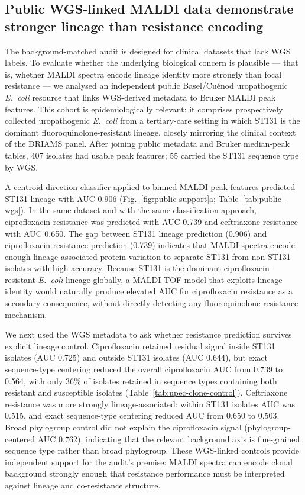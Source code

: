 \documentclass[11pt]{article}
\begin{document}


\subsection*{Public WGS-linked MALDI data demonstrate stronger lineage than resistance encoding}

The background-matched audit is designed for clinical datasets that lack WGS labels. To evaluate whether the underlying biological concern is plausible --- that is, whether MALDI spectra encode lineage identity more strongly than focal resistance --- we analysed an independent public Basel/Cu\'{e}nod uropathogenic \textit{E.~coli} resource that links WGS-derived metadata to Bruker MALDI peak features\cite{cuenod2023papgii}. This cohort is epidemiologically relevant: it comprises prospectively collected uropathogenic \textit{E.~coli} from a tertiary-care setting in which ST131 is the dominant fluoroquinolone-resistant lineage, closely mirroring the clinical context of the DRIAMS panel. After joining public metadata and Bruker median-peak tables, 407 isolates had usable peak features; 55 carried the ST131 sequence type by WGS.

A centroid-direction classifier applied to binned MALDI peak features predicted ST131 lineage with AUC 0.906 (Fig.~\ref{fig:public-support}a; Table~\ref{tab:public-wgs}). In the same dataset and with the same classification approach, ciprofloxacin resistance was predicted with AUC 0.739 and ceftriaxone resistance with AUC 0.650. The gap between ST131 lineage prediction (0.906) and ciprofloxacin resistance prediction (0.739) indicates that MALDI spectra encode enough lineage-associated protein variation to separate ST131 from non-ST131 isolates with high accuracy. Because ST131 is the dominant ciprofloxacin-resistant \textit{E.~coli} lineage globally, a MALDI-TOF model that exploits lineage identity would naturally produce elevated AUC for ciprofloxacin resistance as a secondary consequence, without directly detecting any fluoroquinolone resistance mechanism.

We next used the WGS metadata to ask whether resistance prediction survives explicit lineage control. Ciprofloxacin retained residual signal inside ST131 isolates (AUC 0.725) and outside ST131 isolates (AUC 0.644), but exact sequence-type centering reduced the overall ciprofloxacin AUC from 0.739 to 0.564, with only 36\% of isolates retained in sequence types containing both resistant and susceptible isolates (Table~\ref{tab:upec-clone-control}). Ceftriaxone resistance was more strongly lineage-associated: within ST131 isolates AUC was 0.515, and exact sequence-type centering reduced AUC from 0.650 to 0.503. Broad phylogroup control did not explain the ciprofloxacin signal (phylogroup-centered AUC 0.762), indicating that the relevant background axis is fine-grained sequence type rather than broad phylogroup. These WGS-linked controls provide independent support for the audit's premise: MALDI spectra can encode clonal background strongly enough that resistance performance must be interpreted against lineage and co-resistance structure.
\end{document}
